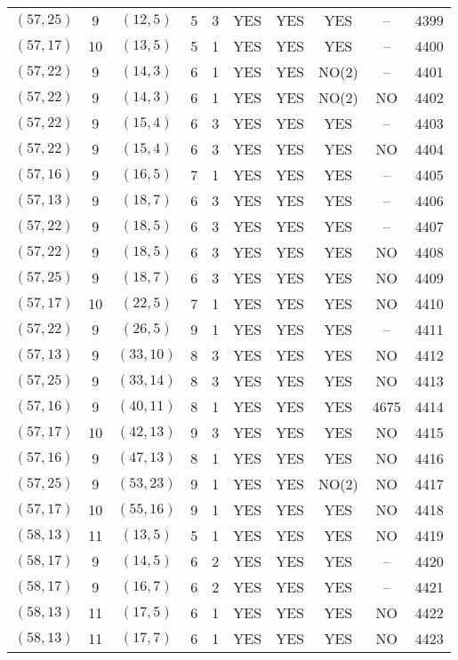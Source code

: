 \begin{longtable}{|c|c|c|c|c|c|c|c|c|c|}
$(57, 25)$ & 9 & $(12, 5)$ & 5 & 3 & YES & YES & YES & -- & 4399\\
$(57, 17)$ & 10 & $(13, 5)$ & 5 & 1 & YES & YES & YES & -- & 4400\\
$(57, 22)$ & 9 & $(14, 3)$ & 6 & 1 & YES & YES & NO(2) & -- & 4401\\
$(57, 22)$ & 9 & $(14, 3)$ & 6 & 1 & YES & YES & NO(2) & NO & 4402\\
$(57, 22)$ & 9 & $(15, 4)$ & 6 & 3 & YES & YES & YES & -- & 4403\\
$(57, 22)$ & 9 & $(15, 4)$ & 6 & 3 & YES & YES & YES & NO & 4404\\
$(57, 16)$ & 9 & $(16, 5)$ & 7 & 1 & YES & YES & YES & -- & 4405\\
$(57, 13)$ & 9 & $(18, 7)$ & 6 & 3 & YES & YES & YES & -- & 4406\\
$(57, 22)$ & 9 & $(18, 5)$ & 6 & 3 & YES & YES & YES & -- & 4407\\
$(57, 22)$ & 9 & $(18, 5)$ & 6 & 3 & YES & YES & YES & NO & 4408\\
$(57, 25)$ & 9 & $(18, 7)$ & 6 & 3 & YES & YES & YES & NO & 4409\\
$(57, 17)$ & 10 & $(22, 5)$ & 7 & 1 & YES & YES & YES & NO & 4410\\
$(57, 22)$ & 9 & $(26, 5)$ & 9 & 1 & YES & YES & YES & -- & 4411\\
$(57, 13)$ & 9 & $(33, 10)$ & 8 & 3 & YES & YES & YES & NO & 4412\\
$(57, 25)$ & 9 & $(33, 14)$ & 8 & 3 & YES & YES & YES & NO & 4413\\
$(57, 16)$ & 9 & $(40, 11)$ & 8 & 1 & YES & YES & YES & 4675 & 4414\\
$(57, 17)$ & 10 & $(42, 13)$ & 9 & 3 & YES & YES & YES & NO & 4415\\
$(57, 16)$ & 9 & $(47, 13)$ & 8 & 1 & YES & YES & YES & NO & 4416\\
$(57, 25)$ & 9 & $(53, 23)$ & 9 & 1 & YES & YES & NO(2) & NO & 4417\\
$(57, 17)$ & 10 & $(55, 16)$ & 9 & 1 & YES & YES & YES & NO & 4418\\
$(58, 13)$ & 11 & $(13, 5)$ & 5 & 1 & YES & YES & YES & NO & 4419\\
$(58, 17)$ & 9 & $(14, 5)$ & 6 & 2 & YES & YES & YES & -- & 4420\\
$(58, 17)$ & 9 & $(16, 7)$ & 6 & 2 & YES & YES & YES & -- & 4421\\
$(58, 13)$ & 11 & $(17, 5)$ & 6 & 1 & YES & YES & YES & NO & 4422\\
$(58, 13)$ & 11 & $(17, 7)$ & 6 & 1 & YES & YES & YES & NO & 4423\\

\end{longtable}
